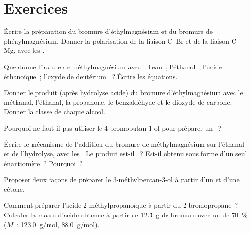 \section{Exercices}

\begin{exercise}[$\star$]\label{exo:b1:organomagnesium:1}
Écrire la préparation du bromure d'éthylmagnésium et du bromure de
phénylmagnésium. Donner la polarisation de la liaison C--Br et de la
liaison C--Mg, avec les .
\end{exercise}

\begin{exercise}[$\star$]\label{exo:b1:organomagnesium:2}
Que donne l'iodure de méthylmagnésium avec~: l'eau~; l'éthanol~;
l'acide éthanoïque~; l'oxyde de deutérium ~? Écrire les
équations.
\end{exercise}

\begin{exercise}[$\star$]\label{exo:b1:organomagnesium:3}
Donner le produit (après hydrolyse acide) du bromure d'éthylmagnésium
avec le méthanal, l'éthanal, la propanone, le benzaldéhyde et le dioxyde
de carbone. Donner la classe de chaque alcool.
\end{exercise}

\begin{exercise}[$\star$]\label{exo:b1:organomagnesium:4}
Pourquoi ne faut-il pas utiliser le 4-bromobutan-1-ol pour préparer un
~?
\end{exercise}

\begin{exercise}[$\star\star$]\label{exo:b1:organomagnesium:5}
Écrire le mécanisme de l'addition du bromure de méthylmagnésium sur
l'éthanal et de l'hydrolyse, avec les . Le produit est-il
~? Est-il obtenu sous forme d'un seul énantiomère~? Pourquoi~?
\end{exercise}

\begin{exercise}[$\star\star$]\label{exo:b1:organomagnesium:6}
Proposer deux façons de préparer le 3-méthylpentan-3-ol à partir d'un
 et d'une cétone.
\end{exercise}

\begin{exercise}[$\star\star$]\label{exo:b1:organomagnesium:7}
Comment préparer l'acide 2-méthylpropanoïque à partir du
2-bromopropane~? Calculer la masse d'acide obtenue à partir de
\qty{12.3}{g} de bromure avec un  de \qty{70}{\percent}
($M$~:  \qty{123.0}{g/mol}, 
\qty{88.0}{g/mol}).
\end{exercise}

